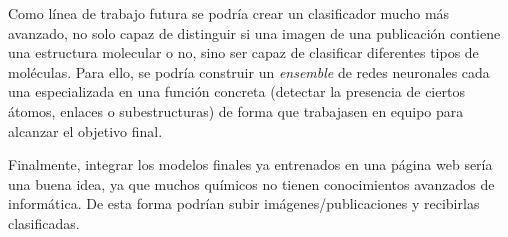 Como línea de trabajo futura se podría crear un clasificador mucho más avanzado, no solo capaz de distinguir si una imagen de una publicación contiene una estructura molecular o no, sino ser capaz de clasificar diferentes tipos de moléculas. Para ello, se podría construir un \textit{ensemble} de redes neuronales cada una especializada en una función concreta (detectar la presencia de ciertos átomos, enlaces o subestructuras) de forma que trabajasen en equipo para alcanzar el objetivo final.

Finalmente, integrar los modelos finales ya entrenados en una página web sería una buena idea, ya que muchos químicos no tienen conocimientos avanzados de informática. De esta forma podrían subir imágenes/publicaciones y recibirlas clasificadas.
